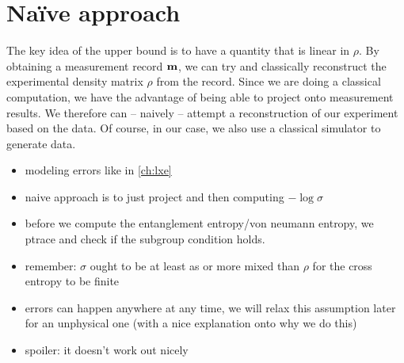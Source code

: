 \section{Na\"ive approach}
The key idea of the upper bound is to have a quantity that is linear in $\rho$.
By obtaining a measurement record $\vb{m}$, we can try and classically
reconstruct the experimental density matrix $\rho$ from the record. Since we
are doing a classical computation, we have the advantage of being able to
project onto measurement results. We therefore can -- naively -- attempt a
reconstruction of our experiment based on the data. Of course, in our case, we
also use a classical simulator to generate data. 
\begin{itemize}
  \item modeling errors like in \cref{ch:lxe}
  \item naive approach is to just project and then computing $-\log\sigma$
  \item before we compute the entanglement entropy/von neumann entropy, we
    ptrace and check if the subgroup condition holds.
  \item remember: $\sigma$ ought to be at least as or more mixed than $\rho$
    for the cross entropy to be finite
  \item errors can happen anywhere at any time, we will relax this assumption
    later for an unphysical one (with a nice explanation onto why we do this)
  \item spoiler: it doesn't work out nicely
\end{itemize}

